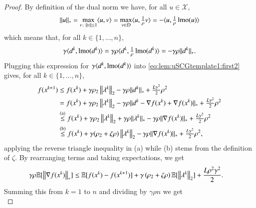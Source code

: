 \begin{toappendix}
\begin{proof}
    By definition of the dual norm we have, for all $u\in\mathcal{X}$,
    \begin{equation*}
        \|u\|_{\ast} = \max\limits_{v\colon \|v\|\leq 1}\langle u,v\rangle = \max_{v\in\mathcal{D}}\langle u,\tfrac{1}{\rho}v\rangle= -\langle u, \tfrac{1}{\rho}\operatorname{lmo}(u)\rangle
    \end{equation*}
    which means that, for all $k\in\{1,\ldots,n\}$,
    \begin{equation*}
        \gamma \langle d^k, \operatorname{lmo}(d^k)\rangle = \gamma\rho\langle d^k,\tfrac{1}{\rho}\operatorname{lmo}(d^k)\rangle = -\gamma\rho\|d^k\|_{\ast}.
    \end{equation*}
    Plugging this expression for $\gamma\langle d^k,\operatorname{lmo}(d^k)\rangle$ into \eqref{eq:lem:uSCGtemplate1:first2} gives, for all $k\in\{1,\ldots,n\}$,
    \begin{equation*}
        \begin{aligned}
            f(x^{k+1})
                &\leq f(x^{k})+\gamma \rho_{2}\left\Vert{\lambda^{k}}\right\Vert_{2}-\gamma\rho\|d^k\|_{\ast} +\tfrac{L\gamma^{2}}{2}\rho^{2}\\
                &= f(x^{k})+\gamma \rho_{2}\left\Vert{\lambda^{k}}\right\Vert_{2}-\gamma\rho\|d^k - \nabla f(x^k) + \nabla f(x^k)\|_{\ast} +\tfrac{L\gamma^{2}}{2}\rho^{2}\\
                &\stackrel{\text{(a)}}{\leq} f(x^{k})+\gamma \rho_{2}\left\Vert{\lambda^{k}}\right\Vert_{2} +\gamma\rho\|\lambda^k\|_{\ast} -\gamma\rho\|\nabla f(x^k)\|_{\ast} +\tfrac{L\gamma^{2}}{2}\rho^{2}\\
                &\stackrel{\text{(b)}}{\leq} f(x^{k})+\gamma (\rho_{2}+\zeta\rho)\left\Vert{\lambda^{k}}\right\Vert_{2}-\gamma\rho\|\nabla f(x^k)\|_{\ast} +\tfrac{L\gamma^{2}}{2}\rho^{2},
        \end{aligned}
    \end{equation*}
    applying the reverse triangle inequality in (a) while (b) stems from the definition of $\zeta$.
    By rearranging terms and taking expectations, we get
    \begin{equation*}
        \begin{aligned}
            \gamma\rho\mathbb{E}[\left\Vert{\nabla f(x^k)}\right\Vert_{\ast}]
                &\leq \mathbb{E}[f(x^{k})-f(x^{k+1})] + \gamma\left(\rho_2+\zeta\rho\right)\mathbb{E}[\left\Vert{\lambda^{k}}\right\Vert_2] +\frac{L\rho^2\gamma^2}{2}.
        \end{aligned}
    \end{equation*}
    Summing this from $k=1$ to $n$ and dividing by $\gamma\rho n$ we get
    \begin{equation*}

\end{equation*}
\end{proof}
\end{toappendix}
